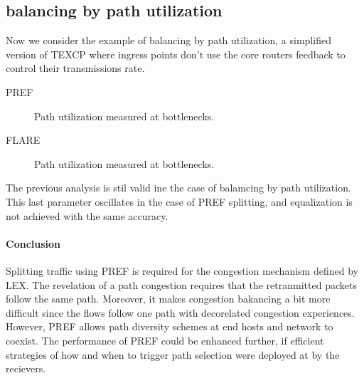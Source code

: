 
\subsection{balancing by path utilization}

Now we consider the example of balancing by path utilization, a simplified version of TEXCP where ingress points don't use the core routers feedback to control their transmissions rate.

PREF

\begin{figure}[h]
 \begin{center}

\caption{
  Path utilization measured at bottlenecks. 
    \label{fig:texcp-util-pref}
}
\end{center}
\end{figure}

FLARE
 \begin{figure}[h!]
 \begin{center}
\caption{
  Path utilization measured at bottlenecks. 
    \label{fig:texcp-util-flare}
}
\end{center}
\end{figure}

The previous analysis is stil valid ine the case of balamcing by path utilization. This last parameter oscillates in the case of PREF splitting, and equalization is not achieved with the same accuracy.

\paragraph{Conclusion}

Splitting traffic using PREF is required for the congestion mechanism defined by LEX. The revelation of a path congestion requires that the retranmitted packets follow the same path. Moreover, it makes congestion bakancing a bit more difficult since the flows follow one path with decorelated congestion experiences. However, PREF allows path diversity schemes at end hosts and network to coexist. The performance of PREF could be enhanced further, if efficient strategies of how and when to trigger path selection were deployed at by the recievers.
 
